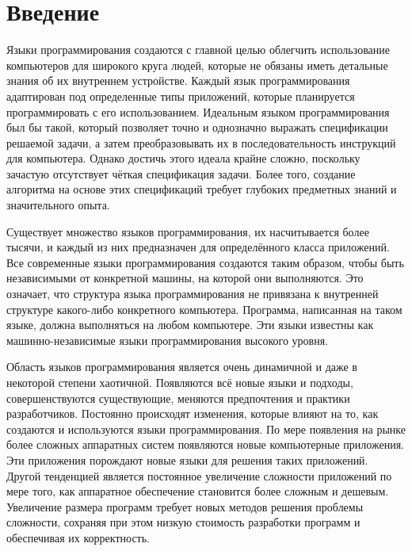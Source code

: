 \documentclass{mipt-thesis-bs}
\begin{document}
\mainmatter


\chapter{Введение}

Языки программирования создаются с главной целью облегчить использование компьютеров для
широкого круга людей, которые не обязаны иметь детальные знания об их внутреннем устройстве.
Каждый язык программирования адаптирован под определенные типы приложений, которые
планируется программировать с его использованием. Идеальным языком программирования
был бы такой, который позволяет точно и однозначно выражать спецификации решаемой
задачи, а затем преобразовывать их в последовательность инструкций для компьютера.
Однако достичь этого идеала крайне сложно, поскольку зачастую отсутствует чёткая
спецификация задачи. Более того, создание алгоритма на основе этих спецификаций
требует глубоких предметных знаний и значительного опыта.

Существует множество языков программирования, их насчитывается более тысячи,
и каждый из них предназначен для определённого класса приложений. Все современные
языки программирования создаются таким образом, чтобы быть независимыми от
конкретной машины, на которой они выполняются. Это означает, что структура языка
программирования не привязана к внутренней структуре какого-либо конкретного
компьютера. Программа, написанная на таком языке, должна выполняться на любом
компьютере. Эти языки известны как
машинно-независимые языки программирования высокого уровня.

Область языков программирования является очень динамичной и даже в некоторой степени хаотичной.
Появляются всё новые языки и подходы, совершенствуются существующие,
меняются предпочтения и практики разработчиков. Постоянно происходят изменения,
которые влияют на то, как создаются и используются языки программирования. По мере появления на рынке
более сложных аппаратных систем появляются новые компьютерные приложения. Эти приложения порождают
новые языки для решения таких приложений. Другой тенденцией является постоянное увеличение сложности
приложений по мере того, как аппаратное обеспечение становится более сложным и дешевым. Увеличение
размера программ требует новых методов решения проблемы сложности, сохраняя при этом низкую стоимость
разработки программ и обеспечивая их корректность.
\end{document}
